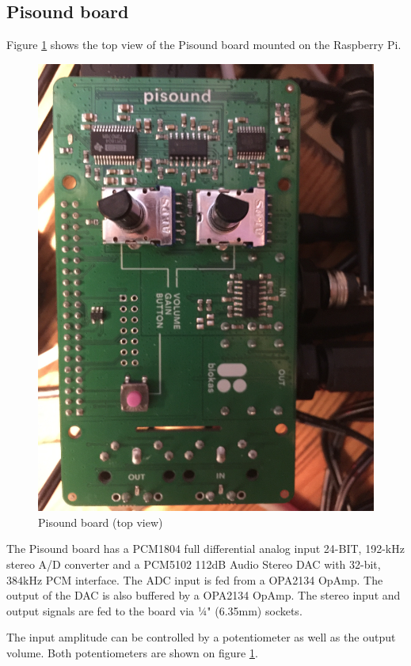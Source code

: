 \documentclass[11pt, oneside]{scrartcl}   	%
\begin{document}
\subsection{Pisound board}
Figure \ref{fig:PisoundBoard} shows the top view of the Pisound board mounted on the Raspberry Pi.
\begin{figure}[tbph]
	\centering
	\includegraphics[width=0.9\linewidth]{Pisound.jpg}
	\caption[Pisound board]{Pisound board (top view)}
	\label{fig:PisoundBoard}
\end{figure}

The Pisound board has a PCM1804 full differential analog input 24-BIT, 192-kHz stereo A/D converter and 
a PCM5102 112dB Audio Stereo DAC with 32-bit, 384kHz PCM interface. The ADC input is fed from a OPA2134 OpAmp. 
The output of the DAC is also buffered by a OPA2134 OpAmp.
The stereo input and output signals are fed to the board via ¼" (6.35mm) sockets.

The input amplitude can be controlled by a potentiometer as well as the output volume. Both potentiometers are shown
on figure \ref{fig:PisoundBoard}.
\end{document}
